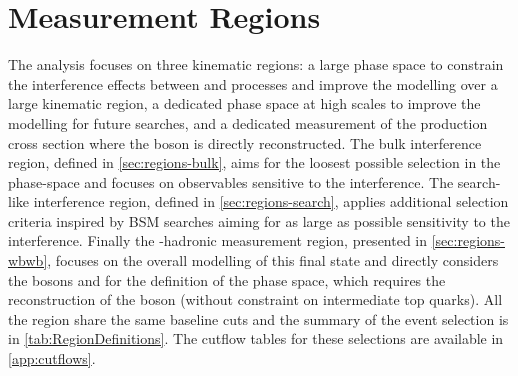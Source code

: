 \chapter{Measurement Regions}%
\label{ch:regions}

The analysis focuses on three kinematic regions: a large phase space
to constrain the interference effects between \ttbar and \tW processes
and improve the modelling over a large kinematic region,
a dedicated phase space at high scales to improve the modelling for future searches,
and a dedicated measurement of the \WbWb production cross section where
the \Wboson boson is directly reconstructed.
The bulk interference region, defined in \cref{sec:regions-bulk}, aims for
the loosest possible selection in the \WbWb phase-space and focuses
on observables sensitive to the interference. The search-like interference
region, defined in \cref{sec:regions-search}, applies additional selection criteria
inspired by BSM searches aiming for as large as possible sensitivity
to the interference. Finally the \Wboson-hadronic measurement region, presented in \cref{sec:regions-wbwb}, focuses on the
overall modelling of this final state and directly considers the \Wboson bosons and \bjets for the definition of the phase space,
which requires the reconstruction of the \Wboson boson (without constraint on intermediate top quarks).
All the region share the same baseline cuts and the summary of the event selection is in \cref{tab:RegionDefinitions}.
The cutflow tables for these selections are available in \cref{app:cutflows}.

